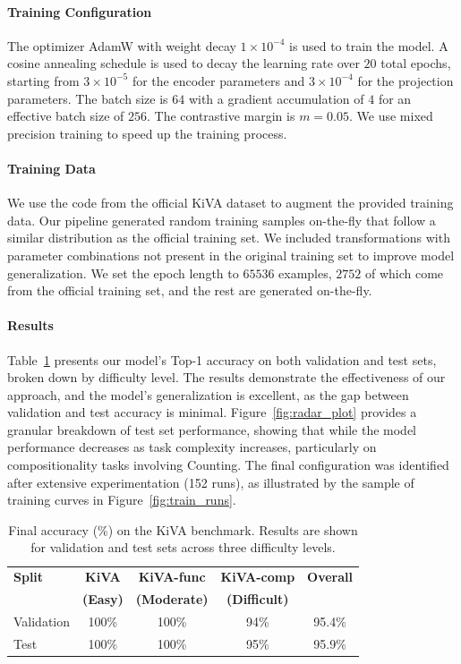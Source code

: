\documentclass[twocolumn]{article} %
\begin{document}
\paragraph{Training Configuration}
The optimizer AdamW with weight decay $1 \times 10^{-4}$ is used to train the model. 
A cosine annealing schedule is used to decay the learning rate over $20$ total epochs, starting from $3 \times 10^{-5}$ for the encoder parameters and $3 \times 10^{-4}$ for the projection parameters. The batch size is $64$ with a gradient accumulation of $4$ for an effective batch size of $256$. The contrastive margin is $m = 0.05$.
We use mixed precision training to speed up the training process.

\paragraph{Training Data}
We use the code from the official KiVA dataset \cite{yee2025kiva} to augment the provided training data. Our pipeline generated random training samples on-the-fly that follow a similar distribution as the official training set. We included transformations with parameter combinations not present in the original training set to improve model generalization. We set the epoch length to $65536$ examples, $2752$ of which come from the official training set, and the rest are generated on-the-fly.

\paragraph{Results}
Table~\ref{tab:kiva_results} presents our model's Top-1 accuracy on both validation and test sets, broken down by difficulty level. The results demonstrate the effectiveness of our approach, and the model's generalization is excellent, as the gap between validation and test accuracy is minimal. Figure~\ref{fig:radar_plot} provides a granular breakdown of test set performance, showing that while the model performance decreases as task complexity increases, particularly on compositionality tasks involving Counting. The final configuration was identified after extensive experimentation (152 runs), as illustrated by the sample of training curves in Figure~\ref{fig:train_runs}.

\begin{table}[!htb]
    \caption{Final accuracy (\%) on the KiVA benchmark. Results are shown for validation and test sets across three difficulty levels.}
    \label{tab:kiva_results}
    \centering
    \setlength{\tabcolsep}{5pt} %
    \begin{tabular}{lcccc}
        \toprule
        \textbf{Split} & \textbf{KiVA} & \textbf{KiVA-func} & \textbf{KiVA-comp} & \textbf{Overall} \\
        & \textbf{(Easy)} & \textbf{(Moderate)} & \textbf{(Difficult)} & \\
        \midrule
        Validation & 100\% & 100\% & 94\% & 95.4\% \\
        Test & 100\% & 100\% & 95\% & 95.9\% \\
        \bottomrule
    \end{tabular}
\end{table}
\end{document}
